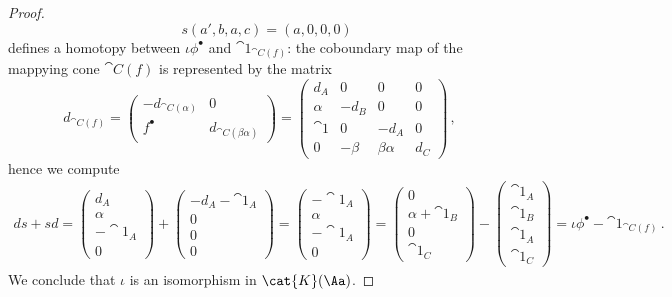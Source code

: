 \begin{prop}
\begin{proof}
\begin{equation*}
            \quad s(a',b,a,c) = (a,0,0,0)
        \end{equation*}
        defines a homotopy between $\iota\phi^{\bullet}$ and $\cat{1}_{\cat{C}(f)}$:
        the coboundary map of the mappying cone $\cat{C}(f)$ is
        represented by the matrix
        \begin{equation*}
            d_{\cat{C}(f)} 
            = \begin{pmatrix}
                -d_{\cat{C}(\alpha)} & 0 \\ f^{\bullet} & d_{\cat{C}(\beta\alpha)}
            \end{pmatrix}
            = \begin{pmatrix}
                d_{A} & 0 & 0 & 0 \\
                \alpha & -d_{B} & 0 & 0 \\
                \cat{1} & 0 & -d_{A} & 0 \\
                0 & -\beta & \beta\alpha & d_{C}
            \end{pmatrix}\,,
        \end{equation*}
        hence we compute
        \begin{align*}
            ds + sd 
            = \begin{pmatrix}
                d_{A} \\ \alpha \\ -\cat{1}_{A} \\ 0
            \end{pmatrix} 
            + \begin{pmatrix}
                -d_{A} - \cat{1}_{A} \\ 0 \\ 0 \\ 0
            \end{pmatrix}
            = \begin{pmatrix}
                -\cat{1}_{A} \\ \alpha \\ -\cat{1}_{A} \\ 0
            \end{pmatrix} 
            = \begin{pmatrix}
                0 \\ \alpha + \cat{1}_{B} \\ 0 \\ \cat{1}_{C}
            \end{pmatrix} 
            - \begin{pmatrix}
               \cat{1}_{A} \\ \cat{1}_{B} \\ \cat{1}_{A} \\ \cat{1}_{C}
            \end{pmatrix}
            = \iota\phi^{\bullet} - \cat{1}_{\cat{C}(f)}\,.
        \end{align*}
        We conclude that $\iota$ is an isomorphism in $\cat{K}(\Aa)$.
    \end{proof}
\end{prop}

